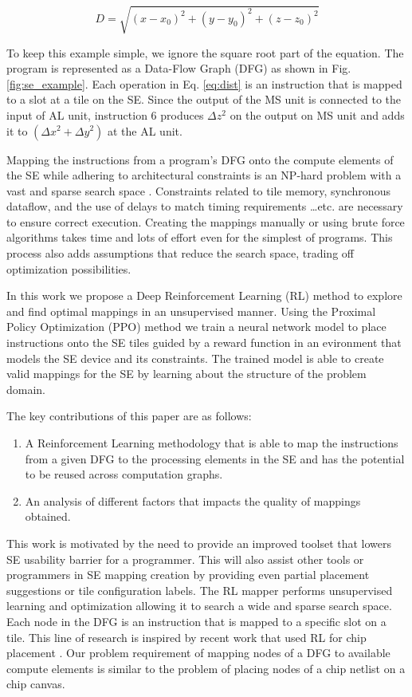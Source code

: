 \begin{equation}
    \label{eq:dist}
    D = \sqrt{(x - x_0)^2 +(y - y_0)^2 + (z - z_0)^2}
\end{equation}

To keep this example simple, we ignore the square root part of the equation.
The program is represented as a Data-Flow Graph (DFG) as shown in Fig. \ref{fig:se_example}.
Each operation in Eq. \ref{eq:dist} is an instruction that is mapped to a slot at a tile on the SE.
Since the output of the MS unit is connected to the input of AL unit, instruction 6 produces $\Delta z^2$ on the output on MS unit and adds it to $(\Delta x^2 + \Delta y^2)$ at the AL unit.


Mapping the instructions from a program's DFG onto the compute elements of the SE while adhering to architectural constraints is an NP-hard problem with a vast and sparse search space \cite{10.1007/3-540-69346-7_30}. 
Constraints related to tile memory, synchronous dataflow, and the use of delays to match timing requirements \dots etc. are necessary to ensure correct execution. 
Creating the mappings manually or using brute force algorithms takes time and lots of effort even for the simplest of programs. 
This process also adds assumptions that reduce the search space, trading off optimization possibilities.  

In this work we propose a Deep Reinforcement Learning (RL) method to explore and find optimal mappings in an unsupervised manner. 
Using the Proximal Policy Optimization (PPO) method we train a neural network model to place instructions onto the SE tiles guided by a reward function in an evironment that models the SE device and its constraints. 
The trained model is able to create valid mappings for the SE by learning about the structure of the problem domain. 


The key contributions of this paper are as follows:
\begin{enumerate}
    \item A Reinforcement Learning methodology that is able to map the instructions from a given DFG to the processing elements in the SE and has the potential to be reused across computation graphs.
    \item An analysis of different factors that impacts the quality of mappings obtained.
\end{enumerate}

This work is motivated by the need to provide an improved toolset that lowers SE usability barrier for a programmer.
This will also assist other tools or programmers in SE mapping creation by providing even partial placement suggestions or tile configuration labels.
The RL mapper performs unsupervised learning and optimization allowing it to search a wide and sparse search space. 
Each node in the DFG is an instruction that is mapped to a specific slot on a tile.
This line of research is inspired by recent work that used RL for chip placement \cite{mirhoseini2020chip}.
Our problem requirement of mapping nodes of a DFG to available compute elements is similar to the problem of placing nodes of a chip netlist on a chip canvas. 

